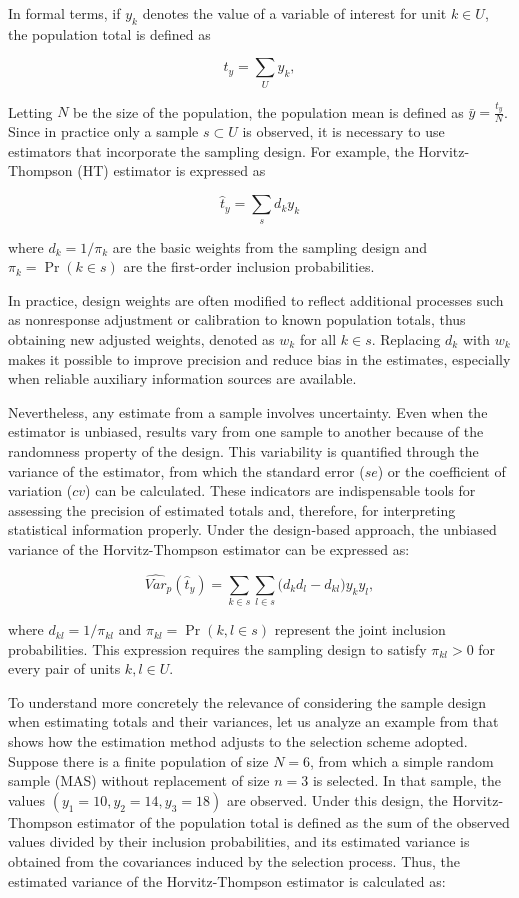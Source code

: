 \documentclass[
  english,
  12pt,
]{book}
\begin{document}
In formal terms, if \(y_k\) denotes the value of a variable of interest for unit \(k \in U\), the population total is defined as

\[
t_y = \sum_{U} y_k,
\]

Letting \(N\) be the size of the population, the population mean is defined as \(\bar{y} = \frac{t_y}{N}\). Since in practice only a sample \(s \subset U\) is observed, it is necessary to use estimators that incorporate the sampling design. For example, the Horvitz-Thompson (HT) estimator is expressed as

\[
\hat{t}_{y} = \sum_{s} d_k y_k
\]

where \(d_k = 1/\pi_k\) are the basic weights from the sampling design and \(\pi_k = \Pr(k \in s)\) are the first-order inclusion probabilities.

In practice, design weights are often modified to reflect additional processes such as nonresponse adjustment or calibration to known population totals, thus obtaining new adjusted weights, denoted as \(w_k\) for all \(k \in s\). Replacing \(d_k\) with \(w_k\) makes it possible to improve precision and reduce bias in the estimates, especially when reliable auxiliary information sources are available.

Nevertheless, any estimate from a sample involves uncertainty. Even when the estimator is unbiased, results vary from one sample to another because of the randomness property of the design. This variability is quantified through the variance of the estimator, from which the standard error (\(se\)) or the coefficient of variation (\(cv\)) can be calculated. These indicators are indispensable tools for assessing the precision of estimated totals and, therefore, for interpreting statistical information properly. Under the design-based approach, the unbiased variance of the Horvitz-Thompson estimator can be expressed as:

\[
\widehat{Var}_p(\hat{t}_{y}) = \sum_{k \in s} \sum_{l \in s} \bigl( d_k d_l - d_{kl} \bigr) y_k y_l,
\]

where \(d_{kl} = 1/\pi_{kl}\) and \(\pi_{kl} = \Pr(k,l \in s)\) represent the joint inclusion probabilities. This expression requires the sampling design to satisfy \(\pi_{kl} > 0\) for every pair of units \(k,l \in U\).

To understand more concretely the relevance of considering the sample design when estimating totals and their variances, let us analyze an example from \citet{UNhandbook} that shows how the estimation method adjusts to the selection scheme adopted. Suppose there is a finite population of size \(N=6\), from which a simple random sample (MAS) without replacement of size \(n=3\) is selected. In that sample, the values \((y_1=10, y_2=14, y_3=18)\) are observed. Under this design, the Horvitz-Thompson estimator of the population total is defined as the sum of the observed values divided by their inclusion probabilities, and its estimated variance is obtained from the covariances induced by the selection process. Thus, the estimated variance of the Horvitz-Thompson estimator is calculated as:
\end{document}
